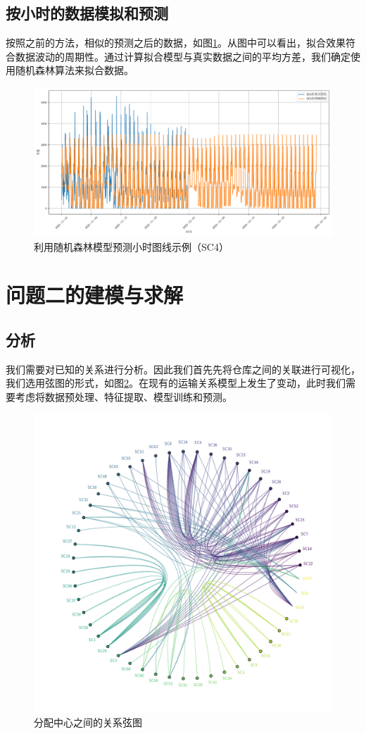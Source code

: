 \documentclass[UTF8,a4paper,10 pt]{article}%
\begin{document}
\subsection{按小时的数据模拟和预测}
按照之前的方法，相似的预测之后的数据，如图\ref{SC4_2}。从图中可以看出，拟合效果符合数据波动的周期性。通过计算拟合模型与真实数据之间的平均方差，我们确定使用随机森林算法来拟合数据。

\begin{figure}[!ht]
	\centering
	\includegraphics*[width=0.9\linewidth]{images/SC_4_2.pdf}
	\caption{利用随机森林模型预测小时图线示例（SC4）}
	\label{SC4_2}
\end{figure}


\section{问题二的建模与求解}
\subsection{分析}
我们需要对已知的关系进行分析。因此我们首先先将仓库之间的关联进行可视化，我们选用弦图的形式，如图\ref{xt}。在现有的运输关系模型上发生了变动，此时我们需要考虑将数据预处理、特征提取、模型训练和预测。



\begin{figure}[!ht]
	\centering
	\includegraphics*[width=0.8\linewidth]{images/xuantu.pdf}
	\caption{分配中心之间的关系弦图}
	\label{xt}
\end{figure}
\end{document}
